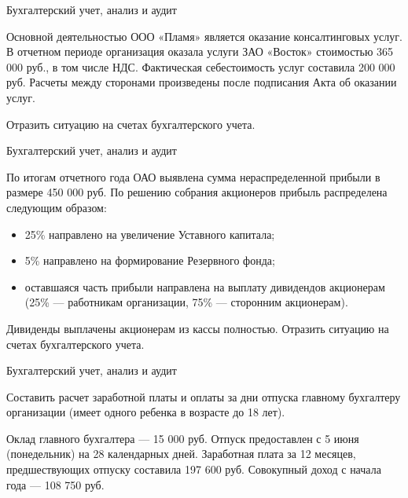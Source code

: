 \documentclass[
	11pt,
	a4paper,
	]
	{article}
\begin{document}
 {Бухгалтерский учет, анализ и аудит}
\prGE	 

	Основной деятельностью ООО «Пламя» является оказание консалтинговых услуг. В отчетном периоде организация оказала услуги ЗАО «Восток» стоимостью 365 000 руб., в том числе НДС. Фактическая себестоимость услуг составила 200 000 руб. Расчеты между сторонами произведены после подписания Акта об оказании услуг. 
	\medskip

	Отразить ситуацию на счетах бухгалтерского учета.

\begin{center}\lowGE * \end{center}
\newpage





 {Бухгалтерский учет, анализ и аудит}
\prGE

	По итогам отчетного года ОАО выявлена сумма нераспределенной прибыли в размере 450 000 руб. По решению собрания акционеров прибыль распределена следующим образом:

	\begin{itemize}
		\item 25\% направлено на увеличение Уставного капитала;
		\item 5\% направлено на формирование Резервного фонда;
		\item оставшаяся часть прибыли направлена на выплату дивидендов акционерам (25\% --- работникам организации, 75\% --- сторонним акционерам). 
	\end{itemize}

	Дивиденды выплачены акционерам из кассы полностью. Отразить ситуацию на счетах бухгалтерского учета.

\begin{center}\lowGE * \end{center}
\newpage





 {Бухгалтерский учет, анализ и аудит}
\prGE

	Составить расчет заработной платы и оплаты за дни отпуска главному бухгалтеру организации (имеет одного ребенка в возрасте до 18 лет).
	\medskip

	Оклад главного бухгалтера --- 15 000 руб. Отпуск предоставлен с 5 июня (понедельник) на 28 календарных дней. Заработная плата за 12 месяцев, предшествующих отпуску составила 197 600 руб. Совокупный доход с начала года --- 108 750 руб. 
	\medskip
\end{document}
